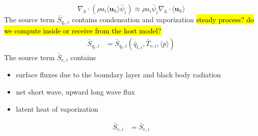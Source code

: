 \documentclass{report}
\begin{document}
$$\nabla_h \cdot (\rho a_i \langle \mathbf{u}_h \rangle \bar{\psi}_i) \approx \rho a_i \bar{\psi}_i \nabla_h \cdot \langle \mathbf{u}_h \rangle$$
The source term $\bar{S}_{q_t, i}$ contains condensation and vaporization \hl{steady process? do we compute inside or receive from the host model?}
\begin{align*}
    \bar{S}_{q_t, i} &= \bar{S}_{q_t, i}(\bar{q}_{t,i}, \bar{T}_{v,i}, \langle p\rangle)
\end{align*}
The source term $\bar{S}_{e, i}$ contains 
\begin{itemize}
    \item surface fluxes due to the boundary layer and black body radiation
    \item net short wave, upward long wave flux
    \item latent heat of vaporization
\end{itemize} 
\begin{align*}
    \bar{S}_{e, i} &=  \bar{S}_{e, i}\\
\end{align*}
\end{document}
